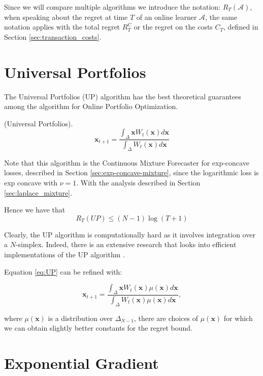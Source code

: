 Since we will compare multiple algorithms we introduce the notation: $R_T(\mathcal A)$, when speaking about the regret at time $T$ of an online learner $\mathcal A$, the same notation applies with the total regret $R_T^C$ or the regret on the costs $C_T$, defined in Section \ref{sec:transaction_costs}.

\section{Universal Portfolios}
The Universal Portfolios (UP) algorithm has the best theoretical guarantees among the algorithm for Online Portfolio Optimization. 

\begin{definition}(Universal Portfolios).
\begin{equation}\label{eq:UP}
\mathbf x_{t+1}=\frac{\int_{\Delta}\mathbf x W_t(\mathbf x)d\mathbf x}{\int_{\Delta} W_t(\mathbf x)d\mathbf x}
\end{equation}
\end{definition}

Note that this algorithm is the Continuous Mixture Forecaster for exp-concave losses, described in Section \ref{sec:exp-concave-mixture}, since the logarithmic loss is exp concave with $\nu=1$. With the analysis described in Section \ref{sec:laplace_mixture}.

Hence we have that 
\begin{equation}
R_T(UP)\le(N-1)\log(T+1)
\end{equation}

Clearly, the UP algorithm is computationally hard as it involves integration over a $N$-simplex. Indeed, there is an extensive research that looks into efficient implementations of the UP algorithm \cite{kalai2002efficient}.

Equation \eqref{eq:UP} can be refined with:

\begin{equation}\label{eq:general_UP}
\mathbf x_{t+1}=\frac{\int_{\Delta}\mathbf x W_t(\mathbf x)\mu(\mathbf x)d\mathbf x}{\int_{\Delta} W_t(\mathbf x)\mu(\mathbf x)d\mathbf x},
\end{equation}

where $\mu(\mathbf x)$ is a distribution over $\Delta_{N-1}$, there are choices of $\mu(\mathbf x)$ for which we can obtain slightly better constants for the regret bound.


\section{Exponential Gradient}

